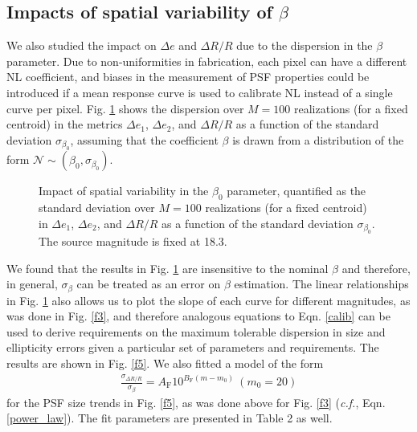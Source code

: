 \documentclass[11pt,preprint,flushrt]{aastex}
\begin{document}
\subsection{Impacts of spatial variability of $\beta$}
We also studied the impact on $\Delta e$ and $\Delta R/R$ due to the dispersion in the $\beta$ parameter. Due to non-uniformities in fabrication, each pixel can have a different NL coefficient, and biases in the measurement of PSF properties could be introduced if a mean response curve is used to calibrate NL instead of a single curve per pixel. Fig. \ref{f4} shows the dispersion over $M=100$ realizations (for a fixed centroid) in the metrics $\Delta e_1$,  $\Delta e_2$, and  $\Delta R/R$  as a function of the standard deviation $ \sigma_{\beta_0}$, assuming that the coefficient $\beta$ is drawn from a distribution of the form $\mathcal{N} \sim (\beta_0, \sigma_{\beta_0})$. 

\begin{figure}[!h]
\centering
{}
\caption{Impact of spatial variability in the $\beta_0$ parameter, quantified as the standard deviation over $M=100$ realizations (for a fixed centroid) in $\Delta e_1$,  $\Delta e_2$, and $\Delta R/R$  as a function of the standard deviation $ \sigma_{\beta_0}$. 
The source magnitude is fixed at 18.3.}
\label{f4}
\end{figure}
We found that the results in Fig. \ref{f4} are insensitive to the nominal $\beta$ and therefore, in general, $\sigma_{\beta}$  can be treated as an error on $\beta$ estimation. The linear relationships in Fig. \ref{f4} also allows us to plot the slope of each curve for different magnitudes, as was done in Fig. \ref{f3}, and therefore analogous equations to Eqn. \ref{calib} can be used to derive requirements on the maximum tolerable dispersion in size and ellipticity errors given a particular set of parameters and requirements. The results are shown in Fig. \ref{f5}. We also fitted a model of the form 
\begin{align}
\frac{\sigma_{\Delta R/ R}} {\sigma_{\beta}} = A_{\text{F}}10^{B_{\text{F}} (m - m_{0})} \ (m_0 =20)
\end{align}
for the PSF size trends in Fig. \ref{f5}, as was done above for Fig. \ref{f3} (\emph{c.f.}, Eqn. \ref{power_law}). The fit parameters are presented in Table 2 as well.  
\end{document}
